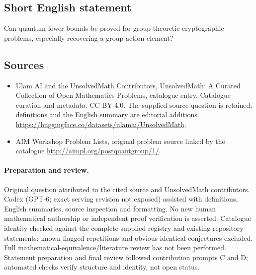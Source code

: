 \documentclass[11pt]{article}
\begin{document}
\subsection{Short English statement}
Can quantum lower bounds be proved for group-theoretic cryptographic problems, especially recovering a group action element?
\subsection{Sources}
\begin{itemize}
\item[\hypertarget{source:statement:1}{S1}] Ulam AI and the UnsolvedMath Contributors, UnsolvedMath: A Curated Collection of Open Mathematics Problems, catalogue entry. Catalogue curation and metadata: CC BY 4.0. The supplied source question is retained; definitions and the English summary are editorial additions.
\url{https://huggingface.co/datasets/ulamai/UnsolvedMath}.
\item[\hypertarget{source:statement:2}{S2}] AIM Workshop Problem Lists, original problem source linked by the catalogue
\url{http://aimpl.org/postquantgroup/1/}.
\end{itemize}
\paragraph{Preparation and review.}
Original question attributed to the cited source and UnsolvedMath contributors. Codex (GPT-6; exact serving revision not exposed) assisted with definitions, English summaries, source inspection and formatting. No new human mathematical authorship or independent proof verification is asserted. Catalogue identity checked against the complete supplied registry and existing repository statements; known flagged repetitions and obvious identical conjectures excluded. Full mathematical-equivalence/literature review has not been performed. Statement preparation and final review followed contribution prompts C and D; automated checks verify structure and identity, not open status.
\label{end:statement}
\end{document}
